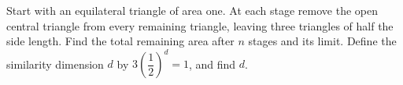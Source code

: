 Start with an equilateral triangle of area one. At each stage remove the open central triangle from every remaining triangle, leaving three triangles of half the side length. Find the total remaining area after $n$ stages and its limit. Define the similarity dimension $d$ by $3(\dfrac{1}{2})^d=1$, and find $d$.
